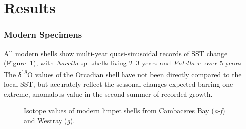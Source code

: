 \documentclass[
  authoryear,
  preprint,
  3p]{elsarticle}
\begin{document}
\section{Results}\label{Results}

\subsubsection{Modern Specimens}\label{modern-specimens-1}

All modern shells show multi-year quasi-sinusoidal records of SST change
(Figure~\ref{fig-Mod_iso}), with \emph{Nacella} sp. shells living 2--3
years and \emph{Patella v}. over 5 years. The δ\textsuperscript{18}O
values of the Orcadian shell have not been directly compared to the
local SST, but accurately reflect the seasonal changes expected barring
one extreme, anomalous value in the second summer of recorded growth.

\begin{figure}


\caption{\label{fig-Mod_iso}Isotope values of modern limpet shells from
Cambaceres Bay (\emph{a-f}) and Westray (\emph{g}).}

\end{figure}%
\end{document}
